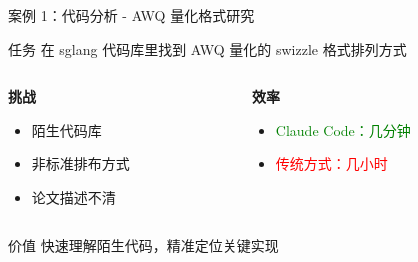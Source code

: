 \documentclass[aspectratio=169,xcolor=dvipsnames]{beamer}
\begin{document}
\begin{frame}{案例 1：代码分析 - AWQ 量化格式研究}
  \begin{block}{任务}
    在 sglang 代码库里找到 AWQ 量化的 swizzle 格式排列方式
  \end{block}

  \vspace{0.3cm}

  \begin{columns}
    \begin{column}{0.48\textwidth}
      \textbf{挑战}
      \begin{itemize}
        \item 陌生代码库
        \item 非标准排布方式
        \item 论文描述不清
      \end{itemize}
    \end{column}
    \begin{column}{0.48\textwidth}
      \textbf{效率}
      \begin{itemize}
        \item \textcolor{green}{Claude Code：几分钟}
        \item \textcolor{red}{传统方式：几小时}
      \end{itemize}
    \end{column}
  \end{columns}

  \vspace{0.3cm}

  \begin{exampleblock}{价值}
    快速理解陌生代码，精准定位关键实现
  \end{exampleblock}
\end{frame}
\end{document}
